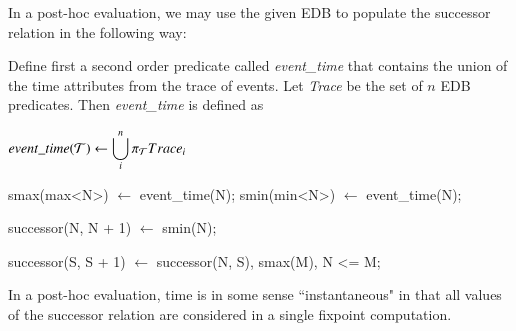 In a post-hoc evaluation, we may use the given EDB to populate the successor relation in the following way:

Define first a second order predicate called \emph{event\_time} 
that contains the union of the time attributes from the trace of events. Let \emph{Trace} be the set of $n$ EDB predicates.  
Then \emph{event\_time} is defined as

$event\_time(\Tau) \leftarrow \displaystyle\bigcup_{i}^n \pi_{\Tau}Trace_{i}$

\begin{Dedalus}
smax(max<N>) \(\leftarrow\) event\_time(N);
smin(min<N>) \(\leftarrow\) event\_time(N);

successor(N, N + 1) \(\leftarrow\) smin(N);

successor(S, S + 1) \(\leftarrow\) 
    successor(N, S),
    smax(M),
    N <= M;
\end{Dedalus}

In a post-hoc evaluation, time is in some sense ``instantaneous" in that all values of the successor relation are considered in a single
fixpoint computation.  
